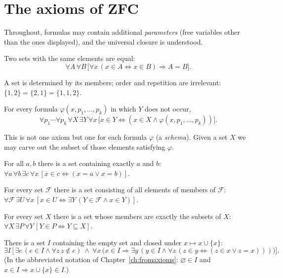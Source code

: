\section{The axioms of ZFC}

Throughout, formulas may contain additional \emph{parameters} (free variables other than the ones displayed), and the universal closure is understood.

\begin{axiom}[Extensionality]\label{ax:ext}
	Two sets with the same elements are equal:
	\[
	\forall A\,\forall B\,\bigl[\forall x\,(x\in A\Leftrightarrow x\in B)\Rightarrow A=B\bigr].
	\]
\end{axiom}
A set is determined by its members; order and repetition are irrelevant: $\{1,2\}=\{2,1\}=\{1,1,2\}$.

\begin{axiom}\label{ax:sep}
	For every formula $\varphi(x,p_1,\dots,p_k)$ in which $Y$ does not occur,
	\[
	\forall p_1\cdots\forall p_k\,\forall X\,\exists Y\,\forall x\,\bigl[x\in Y\Leftrightarrow(x\in X\wedge\varphi(x,p_1,\dots,p_k))\bigr].
	\]
\end{axiom}
This is not one axiom but one for each formula $\varphi$ (a \emph{schema}). Given a set $X$ we may carve out the subset of those elements satisfying $\varphi$.

\begin{axiom}[Pairing]\label{ax:pair}
	For all $a,b$ there is a set containing exactly $a$ and $b$:
	$\forall a\,\forall b\,\exists c\,\forall x\,[x\in c\Leftrightarrow(x=a\vee x=b)]$.
\end{axiom}

\begin{axiom}[Union]\label{ax:union}
	For every set $\mathcal F$ there is a set consisting of all elements of members of $\mathcal F$:
	$\forall\mathcal F\,\exists U\,\forall x\,[x\in U\Leftrightarrow\exists Y\,(Y\in\mathcal F\wedge x\in Y)]$.
\end{axiom}

\begin{axiom}\label{ax:power}
	For every set $X$ there is a set whose members are exactly the subsets of $X$:
	$\forall X\,\exists P\,\forall Y\,[Y\in P\Leftrightarrow Y\subseteq X]$.
\end{axiom}

\begin{axiom}[Infinity]\label{ax:inf}
	There is a set $I$ containing the empty set and closed under $x\mapsto x\cup\{x\}$:
	\[
	\exists I\,\bigl[\,\exists e\,(e\in I\wedge\forall z\,z\notin e)\ \wedge\ \forall x\,\bigl(x\in I\Rightarrow\exists y\,(y\in I\wedge\forall z\,(z\in y\Leftrightarrow(z\in x\vee z=x)))\bigr)\bigr].
	\]
	(In the abbreviated notation of Chapter~\ref{ch:fromaxioms}: $\varnothing\in I$ and $x\in I\Rightarrow x\cup\{x\}\in I$.)
\end{axiom}

